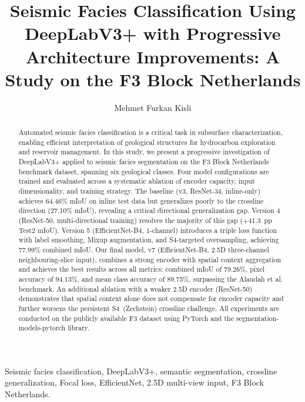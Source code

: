 \documentclass[journal]{IEEEtran}
\begin{document}
\title{Seismic Facies Classification Using DeepLabV3+ with Progressive Architecture Improvements: A Study on the F3 Block Netherlands}

\author{Mehmet Furkan Kisli}

\maketitle

\begin{abstract}
Automated seismic facies classification is a critical task in subsurface characterization, enabling efficient interpretation of geological structures for hydrocarbon exploration and reservoir management. In this study, we present a progressive investigation of DeepLabV3+ applied to seismic facies segmentation on the F3 Block Netherlands benchmark dataset, spanning six geological classes. Four model configurations are trained and evaluated across a systematic ablation of encoder capacity, input dimensionality, and training strategy. The baseline (v3, ResNet-34, inline-only) achieves 64.46\% mIoU on inline test data but generalizes poorly to the crossline direction (27.10\% mIoU), revealing a critical directional generalization gap. Version 4 (ResNet-50, multi-directional training) resolves the majority of this gap (+41.3~pp Test2 mIoU). Version 5 (EfficientNet-B4, 1-channel) introduces a triple loss function with label smoothing, Mixup augmentation, and S4-targeted oversampling, achieving 77.99\% combined mIoU. Our final model, v7 (EfficientNet-B4, 2.5D three-channel neighbouring-slice input), combines a strong encoder with spatial context aggregation and achieves the best results across all metrics: combined mIoU of 79.26\%, pixel accuracy of 94.13\%, and mean class accuracy of 89.75\%, surpassing the Alaudah et al.~\cite{alaudah2019} benchmark. An additional ablation with a weaker 2.5D encoder (ResNet-50) demonstrates that spatial context alone does not compensate for encoder capacity and further worsens the persistent S4~(Zechstein) crossline challenge. All experiments are conducted on the publicly available F3 dataset using PyTorch and the segmentation-models-pytorch library.
\end{abstract}

\begin{IEEEkeywords}
Seismic facies classification, DeepLabV3+, semantic segmentation, crossline generalization, Focal loss, EfficientNet, 2.5D multi-view input, F3 Block Netherlands.
\end{IEEEkeywords}
\end{document}
